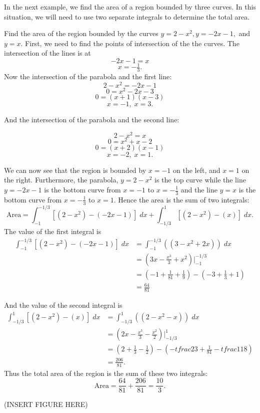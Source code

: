 \documentclass{ximera}
\begin{document}
In the next example, we find the area of a region bounded by three curves. In this situation, we will need to use two separate integrals to determine the total area.

\begin{example}
Find the area of the region bounded by the curves $y = 2-x^2, y = -2x-1,$ and $y = x$.
First, we need to find the points of intersection of the the curves. The intersection of the lines is at
\[
-2x-1 = x 
\]
\[
x = -\tfrac13.
\]
Now the intersection of the parabola and the first line:
\[
 2-x^2 = -2x-1
\]
\[
   0 = x^2 -2x -3 
\]
\[
   0 = (x+1)(x-3)
\]
\[
    x = -1, \; x = 3.
\]

And the intersection of the parabola and the second line:

\[
 2-x^2 = x
\]
\[
   0 =x^2 +x -2
\]
\[
   0 =(x+2)(x-1)
\]
\[
   x = -2, \; x = 1.
\]

We can now see that the region is bounded by $x = -1$ on the left, and  $x = 1$ on the right.
Furthermore, the parabola, $y = 2 - x^2$ is the top curve while the line $y = -2x-1$ is the bottom curve 
from $x = -1$ to $x = -\frac13$ and the line $y = x$ is the bottom curve from $x = -\frac13$ to $x = 1$.
Hence the area is the sum of two integrals:
\[
\text{Area} = \int_{-1}^{-1/3} \left[(2 - x^2) - (-2x-1)\right] \; dx + \int_{-1/3}^1 \left[(2 - x^2) - (x)\right] \; dx.
\]
The value of the first integral is
\begin{align*}
\int_{-1}^{-1/3} \left[(2 - x^2) - (-2x-1)\right] \; dx &= \int_{-1}^{-1/3} \left((3 - x^2 +2x)\right) \; dx \\
                                                        &= \left(3x - \frac{x^3}{3} + x^2 \right)\bigg|_{-1}^{-1/3} \\
                                                        &= \left(-1 + \tfrac{1}{81} + \tfrac19 \right) - \left(-3 + \tfrac13 + 1 \right) \\
                                                        &= \tfrac{64}{81}
\end{align*}

And the value of the second integral is
\begin{align*}
\int_{-1/3}^{1} \left[(2 - x^2) - (x)\right] \; dx &= \int_{-1/3}^{1} \left((2 - x^2 - x)\right) \; dx \\
                                                        &= \left(2x - \frac{x^3}{3} -\frac{x^2}{2} \right)\bigg|_{-1/3}^{1} \\
                                                        &= \left(2 + \tfrac{1}{3} - \tfrac12 \right) - \left(-tfrac23 + \tfrac{1}{81} -tfrac{1}{18} \right) \\
                                                        &= \tfrac{206}{81}.
\end{align*}
Thus the total area of the region is the sum of these two integrals:
\[
\text{Area} = \frac{64}{81} + \frac{206}{81} = \frac{10}{3}.
\]

(INSERT FIGURE HERE)

\end{example}
\end{document}
